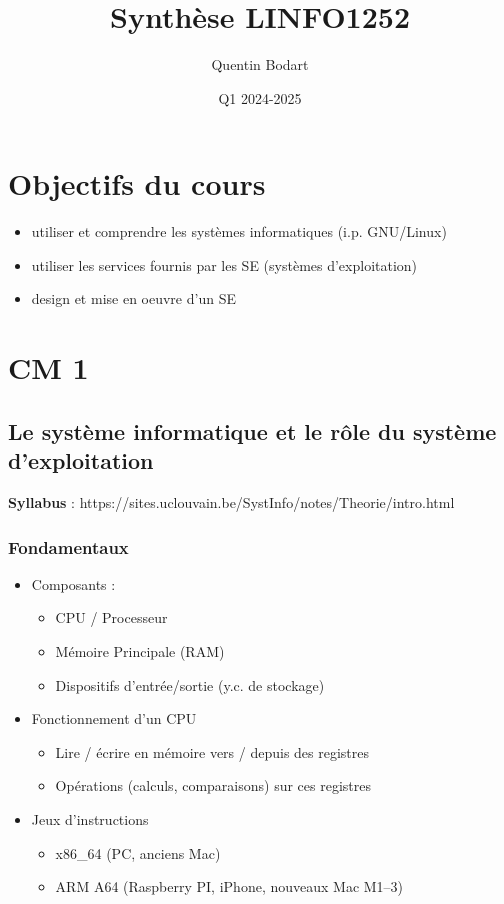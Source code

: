 \documentclass{article}
\title{Synthèse LINFO1252}
\author{Quentin Bodart}
\date{Q1 2024-2025}
\begin{document}
\maketitle
\tableofcontents
\pagebreak

\section*{Objectifs du cours}
    \begin{itemize}
        \item utiliser et comprendre les systèmes informatiques (i.p. GNU/Linux)
        \item utiliser les services fournis par les SE (systèmes d'exploitation)
        \item design et mise en oeuvre d'un SE
    \end{itemize}

\section{CM 1}
    \subsection{Le système informatique et le rôle du système d’exploitation}
    \textbf{Syllabus} : https://sites.uclouvain.be/SystInfo/notes/Theorie/intro.html

        \subsubsection{Fondamentaux}
            \begin{itemize}
                \item Composants :
                \begin{itemize}
                    \item CPU / Processeur
                    \item Mémoire Principale (RAM)
                    \item Dispositifs d’entrée/sortie (y.c. de stockage)
                \end{itemize}
                \item Fonctionnement d'un CPU
                \begin{itemize}
                    \item Lire / écrire en mémoire vers / depuis des registres
                    \item Opérations (calculs, comparaisons) sur ces registres
                \end{itemize}
                \item Jeux d'instructions
                \begin{itemize}
                    \item x86\_64 (PC, anciens Mac)
                    \item ARM A64 (Raspberry PI, iPhone, nouveaux Mac M1–3)
                \end{itemize}
            \end{itemize}
        
\end{document}
